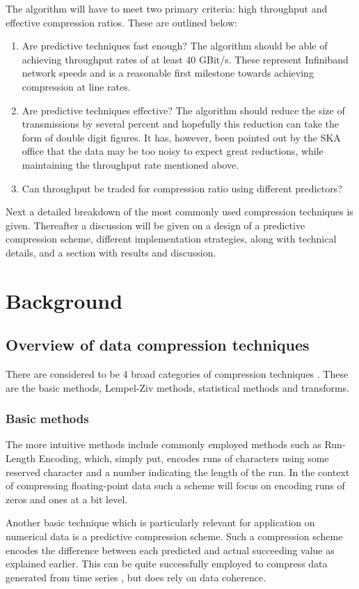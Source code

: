 The algorithm will have to meet two primary criteria: high throughput and effective compression ratios. These are outlined below:
\begin{enumerate}
 \item Are predictive techniques fast enough? The algorithm should be able of achieving throughput rates of at least 40 GBit/s. These represent Infiniband network speeds 
 and is a reasonable first milestone towards achieving compression at line rates.
 \item Are predictive techniques effective? The algorithm should reduce the size of transmissions by several percent and hopefully this reduction can take the form of 
       double digit figures. It has, however, been pointed out by the SKA office that the data may be too noisy to expect great reductions, while maintaining the throughput 
       rate mentioned above.
 \item Can throughput be traded for compression ratio using different predictors?
\end{enumerate}

Next a detailed breakdown of the most commonly used compression techniques is given. Thereafter a discussion will be given on a design of a predictive compression scheme, 
different implementation strategies, along with technical details, and a section with results and discussion.
\section{Background}
\subsection{Overview of data compression techniques}
There are considered to be 4 broad categories of compression techniques \cite{salomon2004data}. These are the basic methods, Lempel-Ziv methods, statistical methods 
and transforms.
\subsubsection{Basic methods}
The more intuitive methods include commonly employed methods such as Run-Length Encoding, which, simply put, encodes runs of characters using some reserved 
character and a number indicating the length of the run. In the context of compressing floating-point data such a scheme will focus on encoding runs of zeros and ones
at a bit level.

Another basic technique which is particularly relevant for application on numerical data is a predictive compression scheme. Such a compression scheme encodes the 
difference between each predicted and actual succeeding value as explained earlier. This can be quite successfully employed to compress data 
generated from time series \cite{engelson2000lossless}, but does rely on data coherence.

